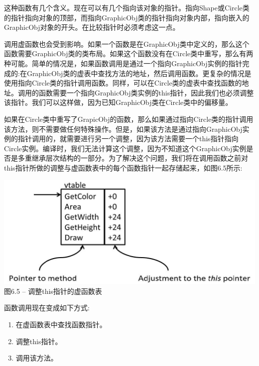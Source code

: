 这种函数有几个含义。现在可以有几个指向该对象的指针。指向Shape或Circle类的指针指向对象的顶部，而指向GraphicObj类的指针指向对象内部，指向嵌入的GraphicObj对象的开头。在比较指针时必须考虑这一点。\par

调用虚函数也会受到影响。如果一个函数是在GraphicObj类中定义的，那么这个函数需要GraphicObj类的类布局。如果这个函数没有在Circle类中重写，那么有两种可能。简单的情况是，如果函数调用是通过一个指向GraphicObj实例的指针完成的:在GraphicObj类的虚表中查找方法的地址，然后调用函数。更复杂的情况是使用指向Circle类的指针调用函数。同样，可以在Circle类的虚表中查找函数的地址。调用的函数需要一个指向GraphicObj类实例的this指针，因此我们也必须调整该指针。我们可以这样做，因为已知GraphicObj类在Circle类中的偏移量。\par

如果在Circle类中重写了GrapicObj的函数，那么如果通过指向Circle类的指针调用该方法，则不需要做任何特殊操作。但是，如果该方法是通过指向GraphicObj实例的指针调用的，就需要进行另一个调整，因为该方法需要一个this指针指向Circle实例。编译时，我们无法计算这个调整，因为不知道这个GraphicObj实例是否是多重继承层次结构的一部分。为了解决这个问题，我们将在调用函数之前对this指针所做的调整与虚函数表中的每个函数指针一起存储起来，如图6.5所示:\par

\hspace*{\fill} \par %
\begin{center}
	\includegraphics{content/2/chapter6/images/5.jpg}\\
	图6.5 – 调整this指针的虚函数表
\end{center}

函数调用现在变成如下方式:\par

\begin{enumerate}
	\item 在虚函数表中查找函数指针。
	\item 调整this指针。
	\item 调用该方法。
\end{enumerate}

